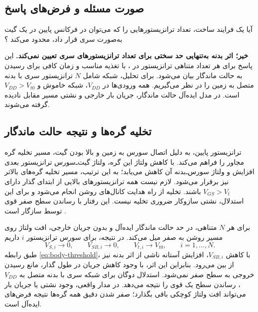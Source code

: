 \subsection*{صورت مسئله و فرض‌های پاسخ}
آیا  یک فرایند ساخت، تعداد ترانزیستورهایی را که می‌توان در فرکانس پایین در یک گیت  به‌صورت سری قرار داد، محدود می‌کند
\cite[تمرین ، صفحه چاپی ۹۶]{weste}؟

\textbf{خیر؛ اثر بدنه به‌تنهایی حد سختی برای تعداد ترانزیستورهای سری تعیین نمی‌کند.}
این پاسخ برای هر تعداد متناهی ترانزیستور در ، با تغذیه مناسب و زمان کافی برای رسیدن به حالت ماندگار بیان می‌شود.
برای تحلیل، شبکه  شامل \(N\) ترانزیستور سری  با بدنه متصل به زمین را در نظر می‌گیریم.
همه ورودی‌ها در \(V_{DD}\)، شبکه  خاموش و \(V_{DD}>V_{t0}\) است.
در مدل ایده‌آل حالت ماندگار، جریان بار خارجی و نشتی مسیر مقابل نادیده گرفته می‌شوند.

\subsection*{تخلیه گره‌ها و نتیجه حالت ماندگار}
ترانزیستور پایین، به دلیل اتصال سورس به زمین و بالا بودن گیت، مسیر تخلیه گره مجاور را فراهم می‌کند.
با کاهش ولتاژ این گره، ولتاژ گیت‌ـ‌سورس ترانزیستور بعدی افزایش و ولتاژ سورس‌ـ‌بدنه آن کاهش می‌یابد؛
به این ترتیب، مسیر تخلیه گره‌های بالاتر نیز برقرار می‌شود.
لازم نیست همه ترانزیستورهای بالایی از ابتدای گذار دارای \(V_{GS}>V_t\) باشند.
تخلیه از راه هدایت کانال‌های روشن انجام می‌شود و برای این استدلال، نشتی سازوکار ضروری تخلیه نیست.
این رفتار با رساندن سطح صفر قوی توسط  سازگار است
\cite[بخش  و خلاصه فصل در صفحه چاپی ۹۵]{weste}\cite[اسلایدهای ۶ تا ۱۳]{mosfet}.

برای هر \(N\) متناهی، در حد حالت ماندگار ایده‌آل و بدون جریان خارجی، افت ولتاژ روی مسیر روشن به صفر میل می‌کند.
در نتیجه، برای سورس ترانزیستور \(i\) داریم
\begin{equation}
 V_{S,i}\longrightarrow0,\qquad
 V_{SB,i}\longrightarrow0,\qquad
 V_{t,i}\longrightarrow V_{t0},\qquad i=1,\ldots,N.
 \label{eq:finite-stack-dc}
\end{equation}
طبق رابطه \eqref{eq:body-threshold}، با کاهش \(V_{SB,i}\)، افزایش آستانه ناشی از اثر بدنه نیز از بین می‌رود.
بنابراین این اثر، با وجود کاهش جریان در طول گذار، مانع رسیدن خروجی به سطح صفر نمی‌شود.
استدلال دوگان برای شبکه سری  با بدنه متصل به \(V_{DD}\)، رساندن سطح یک قوی را نتیجه می‌دهد.
در مدار واقعی، وجود نشتی یا جریان بار می‌تواند افت ولتاژ کوچکی باقی بگذارد؛ صفر شدن دقیق همه گره‌ها نتیجه فرض‌های ایده‌آل است.

